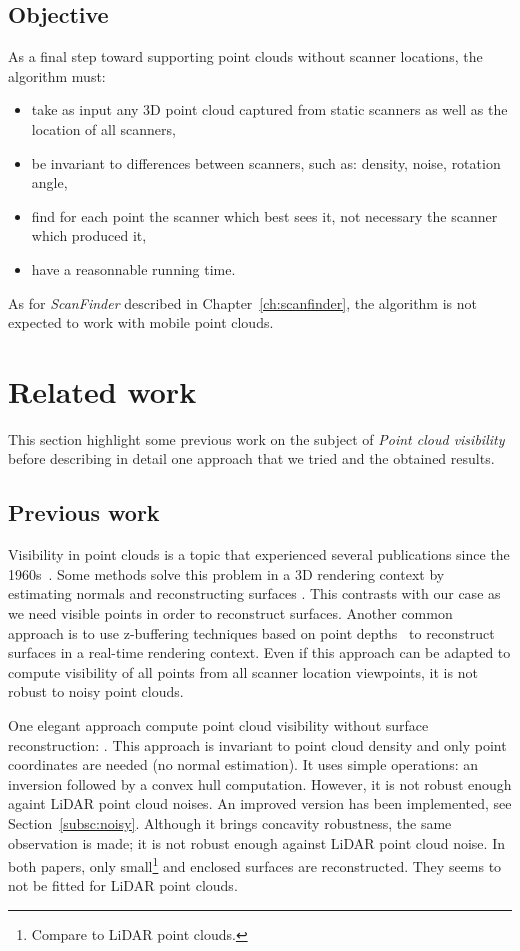 \subsection{Objective}
\label{subsc:vis-objective}
As a final step toward supporting point clouds without scanner locations, the algorithm must:
\begin{itemize}
\item take as input any 3D point cloud captured from static scanners as well as the location of all scanners,
\item be invariant to differences between scanners, such as: density, noise, rotation angle,
\item find for each point the scanner which best sees it, not necessary the scanner which produced it,
\item have a reasonnable running time.
\end{itemize}

As for \emph{ScanFinder} described in Chapter~\ref{ch:scanfinder}, the algorithm is not expected to work with mobile point clouds.


\section{Related work}
\label{sc:related-visibility}
This section highlight some previous work on the subject of \emph{Point cloud visibility} before describing in detail one approach that we tried and the obtained results.

\subsection{Previous work}
Visibility in point clouds is a topic that experienced several publications since the 1960s~\cite{appel, sutherland, funkhouser, greene, bittner}. Some methods solve this problem in a 3D rendering context by estimating normals and reconstructing surfaces \cite{sainz1, sainz2, wald, wu}. This contrasts with our case as we need visible points in order to reconstruct surfaces. Another common approach is to use z-buffering techniques based on point depths~\cite{dachsbacher} to reconstruct
surfaces in a real-time rendering context. Even if this approach can be adapted to compute visibility of all points from all scanner location viewpoints, it is not robust to noisy point clouds.

One elegant approach compute point cloud visibility without surface reconstruction: \cite{vis1}. This approach is invariant to point cloud density and only point coordinates are needed (no normal estimation). It uses simple operations: an inversion followed by a convex hull computation. However, it is not robust enough againt LiDAR point cloud noises. An improved version \cite{vis2} has been implemented, see Section~\ref{subsc:noisy}. Although it brings concavity robustness, the same observation is made; it is not robust enough against LiDAR point cloud noise. In both papers, only small\footnote{Compare to LiDAR point clouds.} and enclosed surfaces are reconstructed. They seems to not be fitted for LiDAR point clouds.

